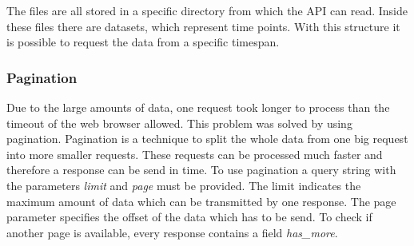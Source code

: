 The files are all stored in a specific directory from which the API can read. Inside these files there are datasets, which represent time points. With this structure it is possible to request the data from a specific timespan.

\subsubsection{Pagination}
Due to the large amounts of data, one request took longer to process than the timeout of the web browser allowed. This problem was solved by using pagination. Pagination is a technique to split the whole data from one big request into more smaller requests. These requests can be processed much faster and therefore a response can be send in time. To use pagination a query string with the parameters \textit{limit} and \textit{page} must be provided. The limit indicates the maximum amount of data which can be transmitted by one response. The page parameter specifies the offset of the data which has to be send. To check if another page is available, every response contains a field \textit{has\_more}.
